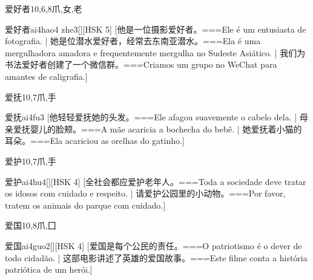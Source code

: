 \begin{Entry}{爱好者}{10,6,8}{⽖,⼥,⽼}
  \begin{Phonetics}{爱好者}{ai4hao4 zhe3}[][HSK 5]
    [他是一位摄影爱好者。===Ele é um entusiasta de fotografia. | 她是位潜水爱好者，经常去东南亚潜水。===Ela é uma mergulhadora amadora e frequentemente mergulha no Sudeste Asiático.  | 我们为书法爱好者创建了一个微信群。===Criamos um grupo no WeChat para amantes de caligrafia.]
  \end{Phonetics}
\end{Entry}

\begin{Entry}{爱抚}{10,7}{⽖,⼿}
  \begin{Phonetics}{爱抚}{ai4fu3}
    [他轻轻爱抚她的头发。===Ele afagou suavemente o cabelo dela. | 母亲爱抚婴儿的脸颊。===A mãe acaricia a bochecha do bebê. | 她爱抚着小猫的耳朵。===Ela acariciou as orelhas do gatinho.]
  \end{Phonetics}
\end{Entry}

\begin{Entry}{爱护}{10,7}{⽖,⼿}
  \begin{Phonetics}{爱护}{ai4hu4}[][HSK 4]
    [全社会都应爱护老年人。===Toda a sociedade deve tratar os idosos com cuidado e respeito. | 请爱护公园里的小动物。===Por favor, tratem os animais do parque com cuidado.]
  \end{Phonetics}
\end{Entry}

\begin{Entry}{爱国}{10,8}{⽖,⼞}
  \begin{Phonetics}{爱国}{ai4guo2}[][HSK 4]
    [爱国是每个公民的责任。===O patriotismo é o dever de todo cidadão. | 这部电影讲述了英雄的爱国故事。===Este filme conta a história patriótica de um herói.]
  \end{Phonetics}
\end{Entry}

